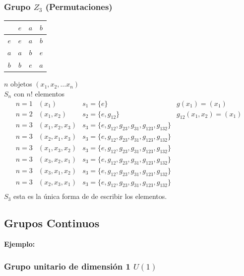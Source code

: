 \documentclass[a4paper,12pt]{article}
\begin{document}
\subsubsection{Grupo $Z_3$ (Permutaciones)} 

\begin{center}
    \begin{table}[h]
    \centering
    \begin{tabular}{c||ccc}
         & $e$& $a$& $b$\\
        \hline \hline
        $e$& $e$& $a$& $b$\\
        $a$& $a$& $b$& $e$\\
        $b$& $b$& $e$& $a$\\
    \end{tabular}
    \label{tab:placeholder_label}
\end{table}
\end{center}
$n $ objetos $(x_1,x_2,\ldots x_n )$ \\
$S_n$ con $n!$ elementos\\
\[  
\begin{array}{cccc}
    n =1  & (x_1) & s_1= \{ e \} & g(x_1)= (x_1)   \\
     n =2  & (x_1,x_2) & s_2= \{ e,g_{12} \} & g_{12}(x_1,x_2)= (x_1)   \\
     n =3  & (x_1,x_2,x_3) & s_3= \{ e,g_{12},g_{23},g_{31},g_{123},g_{132} \} &     \\
     n =3  & (x_2,x_1,x_3) & s_3= \{ e,g_{12},g_{23},g_{31},g_{123},g_{132} \} &     \\
     n =3  & (x_1,x_3,x_2) & s_3= \{ e,g_{12},g_{23},g_{31},g_{123},g_{132} \} &     \\
     n =3  & (x_3,x_2,x_1) & s_3= \{ e,g_{12},g_{23},g_{31},g_{123},g_{132} \} &     \\
     n =3  & (x_3,x_1,x_2) & s_3= \{ e,g_{12},g_{23},g_{31},g_{123},g_{132} \} &     \\
     n =3  & (x_2,x_3,x_1) & s_3= \{ e,g_{12},g_{23},g_{31},g_{123},g_{132} \} &     \\
\end{array}
\]
$S_3$ esta es la única forma de de escribir los elementos. 

\subsection{Grupos  Continuos}
\textbf{Ejemplo:} 
\subsubsection{Grupo unitario de dimensión 1 $U(1)$}
\end{document}
